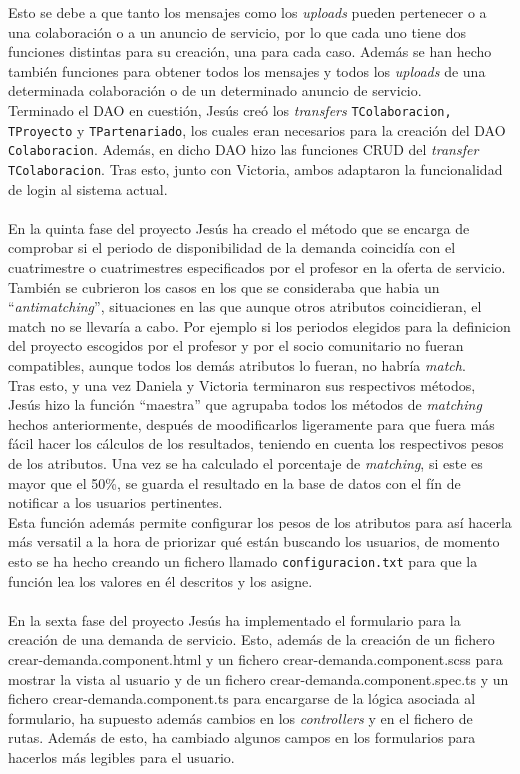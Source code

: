 \documentclass[11pt]{book}
\begin{document}
Esto se debe a que tanto los mensajes como los \emph{uploads} pueden pertenecer o a una colaboración o a un anuncio de servicio, por lo que cada uno tiene dos funciones distintas para su creación, una para cada caso. Además se han hecho también funciones para obtener todos los mensajes y todos los \emph{uploads} de una determinada colaboración o de un determinado anuncio de servicio.\\
Terminado el DAO en cuestión, Jesús creó los \emph{transfers} \texttt{TColaboracion, TProyecto} y \texttt{TPartenariado}, los cuales eran necesarios para la creación del DAO \texttt{Colaboracion}. Además, en dicho DAO hizo las funciones CRUD del \emph{transfer} \texttt{TColaboracion}. Tras esto, junto con Victoria, ambos adaptaron la funcionalidad de login al sistema actual.\\\\
En la quinta fase del proyecto Jesús ha creado el método que se encarga de comprobar si el periodo de disponibilidad de la demanda coincidía con el cuatrimestre o cuatrimestres especificados por el profesor en la oferta de servicio. También se cubrieron los casos en los que se consideraba que habia un ``\emph{antimatching}'', situaciones en las que aunque otros atributos coincidieran, el match no se llevaría a cabo. Por ejemplo si los periodos elegidos para la definicion del proyecto escogidos por el profesor y por el socio comunitario no fueran compatibles, aunque todos los demás atributos lo fueran, no habría \emph{match}.\\
Tras esto, y una vez Daniela y Victoria terminaron sus respectivos métodos, Jesús hizo la función ``maestra'' que agrupaba todos los métodos de \emph{matching} hechos anteriormente, después de moodificarlos ligeramente para que fuera más fácil hacer los cálculos de los resultados, teniendo en cuenta los respectivos pesos de los atributos. Una vez se ha calculado el porcentaje de \emph{matching}, si este es mayor que el 50\%, se guarda el resultado en la base de datos con el fín de notificar a los usuarios pertinentes.\\
Esta función además permite configurar los pesos de los atributos para así hacerla más versatil a la hora de priorizar qué están buscando los usuarios, de momento esto se ha hecho creando un fichero llamado \texttt{configuracion.txt} para que la función lea los valores en él descritos y los asigne.\\\\
En la sexta fase del proyecto Jesús ha implementado el formulario para la creación de una demanda de servicio. Esto, además de la creación de un fichero crear-demanda.component.html y un fichero crear-demanda.component.scss para mostrar la vista al usuario  y de un fichero crear-demanda.component.spec.ts
 y un fichero crear-demanda.component.ts para encargarse de la lógica asociada al formulario, ha supuesto además cambios en los \emph{controllers} y en el fichero de rutas. Además de esto, ha cambiado algunos campos en los formularios para hacerlos más legibles para el usuario.
\end{document}
